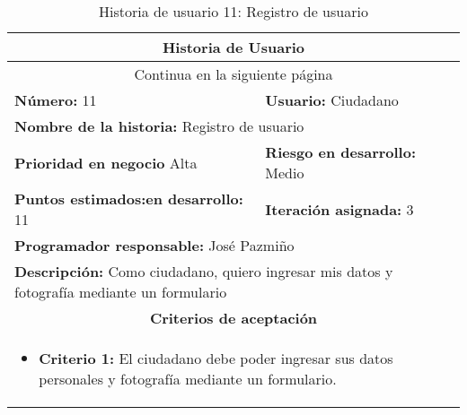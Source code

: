 \begin{longtable}{|p{6.7cm}|p{6.7cm}|}
    \caption{Historia de usuario 11: Registro de usuario} \label{tab:historia-11}
    \\
    \hline
    \multicolumn{2}{|c|}{\textbf{Historia de Usuario}}                                                                                \\
    \hline

    \endfirsthead

    \hline
    \endhead

    \hline
    \multicolumn{2}{|c|}{{Continua en la siguiente página}}                                                                           \\
    \hline
    \endfoot

    \hline
    \endlastfoot

    \textbf{Número:} 11                                  & \textbf{Usuario:} Ciudadano                                                \\
    \hline
    \multicolumn{2}{|l|}{\textbf{Nombre de la historia:} Registro de usuario}                                                         \\
    \hline
    \textbf{Prioridad en negocio}  Alta                  & \textbf{Riesgo en desarrollo:} Medio                                       \\
    \hline
    \textbf{\textbf{Puntos estimados:}en desarrollo:} 11 & \textbf{Iteración asignada:} 3                                             \\
    \hline
    \multicolumn{2}{|l|}{\textbf{Programador responsable:} José Pazmiño }                                                             \\
    \hline
    \multicolumn{2}{|p{13.4cm}|}{\textbf{Descripción:} Como ciudadano, quiero ingresar mis datos y fotografía mediante un formulario} \\
    \hline
    \multicolumn{2}{|c|}{\textbf{Criterios de aceptación}}                                                                            \\
    \hline
    \multicolumn{2}{|p{13.4cm}|}{
    \begin{itemize}[label={},leftmargin=*, nosep]
        \item \textbf{Criterio 1:} El ciudadano debe poder ingresar sus datos personales y fotografía mediante un formulario.
    \end{itemize}
    }                                                                                                                                 \\
\end{longtable}


